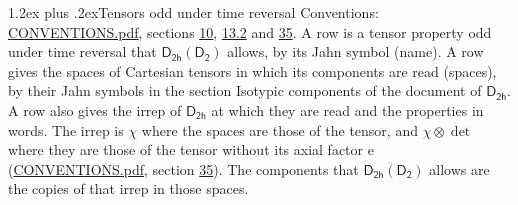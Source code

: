 \documentclass[10pt,a4paper]{article}
\makeatletter
\renewcommand\section{\@startsection{section}{1}{\z@}{-3ex plus -1ex minus -.2ex}%
  {1.2ex plus .2ex}{\normalfont\large\sffamily\bfseries\color{parttitle}}}
\numberwithin{equation}{section}
\newcommand{\grp}[1]{\mathsf{#1}}
\newcommand{\irrprod}{\otimes}
\makeatother
\begin{document}
\section{Tensors odd under time reversal}\label{s:time_odd}
Conventions: \href{../../CONVENTIONS.pdf}{CONVENTIONS.pdf}, sections \href{../../../rotation/CONVENTIONS.pdf\#conv.10}{10}, \href{../../../rotation/CONVENTIONS.pdf\#conv.13.2}{13.2} and \href{../../CONVENTIONS.pdf\#conv.35}{35}.
\leavevmode\label{n:head.name.property}A row is a tensor property odd under time reversal that $\grp{D_{2h}}(\grp{D_{2}})$ allows, by its Jahn symbol (name). \label{n:head.spaces}A row gives the spaces of Cartesian tensors in which its components are read (spaces), by their Jahn symbols in the section Isotypic components of the document of \href{../../../rotation/data/pdf/D2h.pdf}{$\grp{D_{2h}}$}. \label{n:head.properties}A row also gives the irrep of $\grp{D_{2h}}$ at which they are read and the properties in words. The irrep is $\chi$ where the spaces are those of the tensor, and $\chi \irrprod \det$ where they are those of the tensor without its axial factor e (\href{../../CONVENTIONS.pdf}{CONVENTIONS.pdf}, section \href{../../CONVENTIONS.pdf\#conv.35}{35}). The components that $\grp{D_{2h}}(\grp{D_{2}})$ allows are the copies of that irrep in those spaces.
\end{document}
